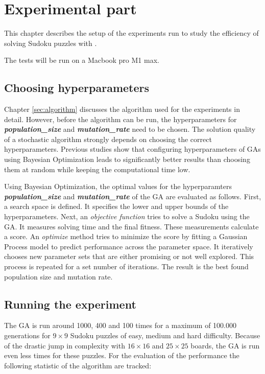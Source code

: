 \section{Experimental part}
\label{sec:experimentation}

This chapter describes the setup of the experiments run to study the efficiency of solving Sudoku puzzles with .

The tests will be run on a Macbook pro M1 max.

\subsection{Choosing hyperparameters}
Chapter \ref{sec:algorithm} discusses the algorithm used for the experiments in detail. However, before the algorithm can be run, the hyperparameters for \textit{\textbf{population\_size}} and \textit{\textbf{mutation\_rate}} need to be chosen. The solution quality of a stochastic algorithm strongly depends on choosing the correct hyperparameters. Previous studies show that configuring hyperparameters of GAs using Bayesian Optimization leads to significantly better results than choosing them at random while keeping the computational time low\cite{Ruether}.

Using Bayesian Optimization, the optimal values for the hyperparamters \textit{\textbf{population\_size}} and \textit{\textbf{mutation\_rate}} of the GA are evaluated as follows. First, a search space is defined. It specifies the lower and upper bounds of the hyperparameters. Next, an \textit{objective function} tries to solve a Sudoku using the GA. It measures solving time and the final fitness. These measurements calculate a score. An \textit{optimize} method tries to minimize the score by fitting a Gaussian Process model to predict performance across the parameter space. It iteratively chooses new parameter sets that are either promising or not well explored. This process is repeated for a set number of iterations. The result is the best found population size and mutation rate. 
\newpage

\subsection{Running the experiment}
The GA is run around 1000, 400 and 100 times for a maximum of 100.000 generations for $9 \times 9$ Sudoku puzzles of easy, medium and hard difficulty. Because of the drastic jump in complexity with $16 \times 16$ and $25 \times 25$ boards, the GA is run even less times for these puzzles. For the evaluation of the performance the following statistic of the algorithm are tracked:


